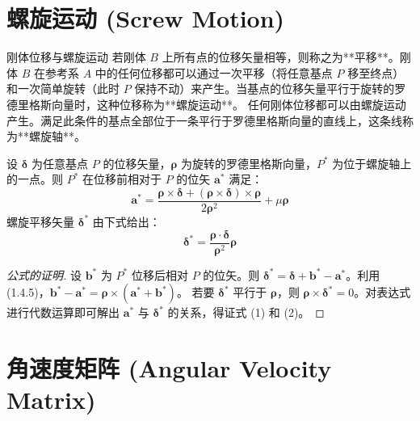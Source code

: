 \section{螺旋运动 (Screw Motion)}

\begin{mydefinition}{刚体位移与螺旋运动}
若刚体 \(B\) 上所有点的位移矢量相等，则称之为**平移**。刚体 \(B\) 在参考系 \(A\) 中的任何位移都可以通过一次平移（将任意基点 \(P\) 移至终点）和一次简单旋转（此时 \(P\) 保持不动）来产生。当基点的位移矢量平行于旋转的罗德里格斯向量时，这种位移称为**螺旋运动**。
任何刚体位移都可以由螺旋运动产生。满足此条件的基点全部位于一条平行于罗德里格斯向量的直线上，这条线称为**螺旋轴**。
\end{mydefinition}

设 \(\boldsymbol{\delta}\) 为任意基点 \(P\) 的位移矢量，\(\boldsymbol{\rho}\) 为旋转的罗德里格斯向量，\(P^*\) 为位于螺旋轴上的一点。则 \(P^*\) 在位移前相对于 \(P\) 的位矢 \(\mathbf{a}^*\) 满足：
\begin{equation}
\mathbf{a}^* = \frac{\boldsymbol{\rho} \times \boldsymbol{\delta} + (\boldsymbol{\rho} \times \boldsymbol{\delta}) \times \boldsymbol{\rho}}{2\boldsymbol{\rho}^2} + \mu \boldsymbol{\rho} \tag{1}
\end{equation}
螺旋平移矢量 \(\boldsymbol{\delta}^*\) 由下式给出：
\begin{equation}
\boldsymbol{\delta}^* = \frac{\boldsymbol{\rho} \cdot \boldsymbol{\delta}}{\boldsymbol{\rho}^2} \boldsymbol{\rho} \tag{2}
\end{equation}

\begin{proof}[公式的证明]
设 \(\mathbf{b}^*\) 为 \(P^*\) 位移后相对 \(P\) 的位矢。则 \(\boldsymbol{\delta}^* = \boldsymbol{\delta} + \mathbf{b}^* - \mathbf{a}^*\)。利用 (1.4.5)，\(\mathbf{b}^* - \mathbf{a}^* = \boldsymbol{\rho} \times (\mathbf{a}^* + \mathbf{b}^*)\)。
若要 \(\boldsymbol{\delta}^*\) 平行于 \(\boldsymbol{\rho}\)，则 \(\boldsymbol{\rho} \times \boldsymbol{\delta}^* = 0\)。对表达式进行代数运算即可解出 \(\mathbf{a}^*\) 与 \(\boldsymbol{\delta}^*\) 的关系，得证式 (1) 和 (2)。
\end{proof}

\section{角速度矩阵 (Angular Velocity Matrix)}

